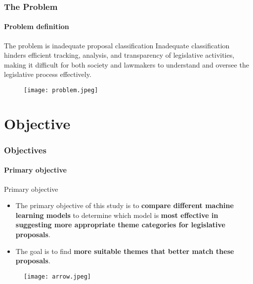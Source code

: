 \begin{frame}
	\frametitle{The Problem}
	\framesubtitle{Problem definition}	

	\begin{alertblock}{The problem is inadequate proposal classification}
		Inadequate classification hinders efficient tracking, analysis, and transparency of legislative activities, making it difficult for both society and lawmakers to understand and oversee the legislative process effectively.
	\end{alertblock}	

	\begin{figure}
		\texttt{[image: problem.jpeg]}
	\end{figure}


\end{frame}
\section{Objective}

\begin{frame}
	\frametitle{Objectives}
	\framesubtitle{Primary objective}
	
	\begin{exampleblock}{Primary objective} 
		\begin{itemize}
			\item The primary objective of this study is to \textbf{compare different machine learning models} to determine which model is \textbf{most effective in suggesting more appropriate theme categories for legislative proposals}.
			
			\item The goal is to find \textbf{more suitable themes that better match these proposals}.  
		\end{itemize}
	\end{exampleblock}
	
	\begin{figure}
		\texttt{[image: arrow.jpeg]}
	\end{figure}
	



	
	
	
	
\end{frame}


